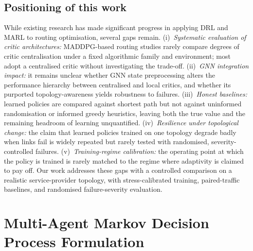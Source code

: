 \documentclass[10pt,journal,comsoc]{IEEEtran}
\begin{document}
\subsection{Positioning of this work}
While existing research has made significant progress in applying DRL and MARL to routing optimisation, several gaps remain. (i)~\emph{Systematic evaluation of critic architectures:} MADDPG-based routing studies rarely compare degrees of critic centralisation under a fixed algorithmic family and environment; most adopt a centralised critic without investigating the trade-off. (ii)~\emph{GNN integration impact:} it remains unclear whether GNN state preprocessing alters the performance hierarchy between centralised and local critics, and whether its purported topology-awareness yields robustness to failures. (iii)~\emph{Honest baselines:} learned policies are compared against shortest path but not against uninformed randomisation or informed greedy heuristics, leaving both the true value and the remaining headroom of learning unquantified. (iv)~\emph{Resilience under topological change:} the claim that learned policies trained on one topology degrade badly when links fail is widely repeated but rarely tested with randomised, severity-controlled failures. (v)~\emph{Training-regime calibration:} the operating point at which the policy is trained is rarely matched to the regime where adaptivity is claimed to pay off. Our work addresses these gaps with a controlled comparison on a realistic service-provider topology, with stress-calibrated training, paired-traffic baselines, and randomised failure-severity evaluation.

\section{Multi-Agent Markov Decision Process Formulation} \label{model}
\end{document}

